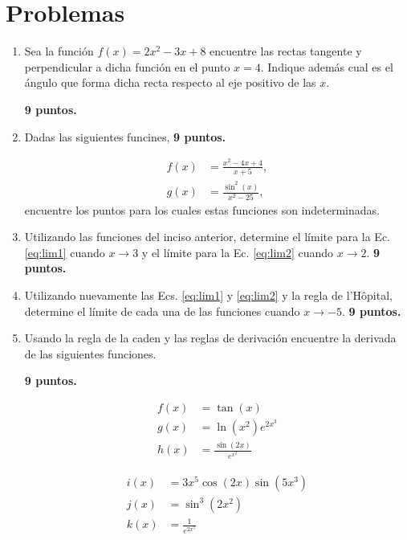 \documentclass{article}
\begin{document}



\section{Problemas} %
\label{sec:problemas}

\begin{enumerate}

\item Sea la función $f(x)= 2x^{2} -3x + 8$ encuentre las rectas tangente y
perpendicular a dicha función en el punto $x=4$. Indique además cual es el
ángulo que forma dicha recta respecto al eje positivo de las $x$.

\hfill \textbf{9 puntos.}

\item Dadas las siguientes funcines, 
\hfill \textbf{9 puntos.}

\begin{align}
f(x) &= \frac{x^{2} - 4x  + 4 }{x+5}, \label{eq:lim1}
\\
g(x) &= \frac{\sin^{2}(x)}{x^{2}-25}, \label{eq:lim2}
\end{align}
encuentre los puntos para los cuales estas funciones son indeterminadas.

\item Utilizando las funciones del inciso anterior, determine el límite para la
Ec. \eqref{eq:lim1} cuando $x\rightarrow3$ y el límite para la Ec.
\eqref{eq:lim2} cuando $x\rightarrow2$.
\hfill \textbf{9 puntos.}

\item Utilizando nuevamente las Ecs. \eqref{eq:lim1} y \eqref{eq:lim2} y la
regla de l'H\^opital, determine el límite de cada una de las funciones cuando
$x\rightarrow-5$.
\hfill \textbf{9 puntos.}

\newpage
\item Usando la regla de la caden y las reglas de derivación encuentre la
derivada de las siguientes funciones.

\hfill \textbf{9 puntos.}

\noindent
\begin{minipage}{0.5\linewidth}
\begin{align}
\label{eq:f(x)} f(x) &= \tan(x)  \\
\label{eq:g(x)} g(x) &= \ln(x^{2})e^{2x^{3}}  \\
\label{eq:h(x)} h(x) &= \frac{\sin(2x)}{e^{x^{2}}}  
\end{align}
\end{minipage}%
\begin{minipage}{0.5\linewidth}
\begin{align}
\label{eq:i(x)} i(x) &= 3x^5\cos(2x)\sin(5x^{3})  \\
\label{eq:j(x)} j(x) &= \sin^{3}(2x^{2})  \\
\label{eq:k(x)} k(x) &= \frac{1}{e^{2x^{5}}}  
\end{align}
\end{minipage}


\end{enumerate}
\end{document}
